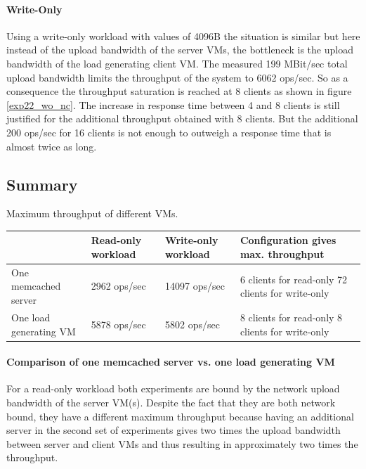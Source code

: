 \documentclass[report.tex]{subfiles}
\begin{document}
\paragraph{Write-Only}
Using a write-only workload with values of 4096B the situation is similar but here instead of the upload bandwidth of the server VMs, the bottleneck is the upload bandwidth of the load generating client VM. The measured 199 MBit/sec total upload bandwidth limits the throughput of the system to 6062 ops/sec. So as a consequence  the throughput saturation is reached at 8 clients as shown in figure \ref{exp22_wo_nc}. The increase in response time between 4 and 8 clients is still justified for the additional throughput obtained with 8 clients. But the additional 200 ops/sec for 16 clients is not enough to outweigh a response time that is almost twice as long.


\subsection{Summary}


\begin{center}
	{Maximum throughput of different VMs.}
	\begin{tabular}{|l|p{2cm}|p{2cm}|p{4cm}|}
		\hline                        & Read-only workload & Write-only workload & Configuration gives max. throughput \\ 
		\hline One memcached server   & 2962 ops/sec       & 14097 ops/sec & 6 clients for read-only 72 clients for write-only\\ 
		\hline One load generating VM & 5878 ops/sec       &  5802 ops/sec & 8 clients for read-only \hphantom{0} 8 clients for write-only\\ 
		\hline 
	\end{tabular}
\end{center}



\paragraph{Comparison of one memcached server vs. one load generating VM}
For a read-only workload both experiments are bound by the network upload bandwidth of the server VM(s).
Despite the fact that they are both network bound, they have a different maximum throughput because having an additional server in the second set of experiments gives two times the upload bandwidth between server and client VMs and thus resulting in approximately two times the throughput.
\end{document}
